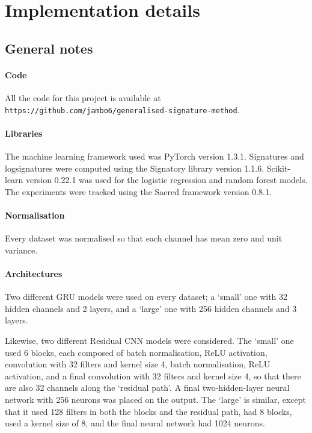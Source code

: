 \documentclass{article}
\theoremstyle{definition}
\theoremstyle{remark}
\begin{document}
	\section{Implementation details}
	\label{sec:implementation_details}
	
	\subsection{General notes}
	
	\paragraph{Code} All the code for this project is available at\\ \texttt{https://github.com/jambo6/generalised-signature-method}.
	
	\paragraph{Libraries} The machine learning framework used was PyTorch \citep{pytorch} version 1.3.1. Signatures and logsignatures were computed using the Signatory library \citep{signatory} version 1.1.6. Scikit-learn \citep{scikit-learn} version 0.22.1 was used for the logistic regression and random forest models. The experiments were tracked using the Sacred framework \citep{greff2017sacred} version 0.8.1.

	\paragraph{Normalisation} Every dataset was normalised so that each channel has mean zero and unit variance.
	
	\paragraph{Architectures} Two different GRU models were used on every dataset; a `small' one with 32 hidden channels and 2 layers, and a `large' one with 256 hidden channels and 3 layers.
	
	Likewise, two different Residual CNN models were considered. The `small' one used 6 blocks, each composed of batch normalisation, ReLU activation, convolution with 32 filters and kernel size 4, batch normalisation, ReLU activation, and a final convolution with 32 filters and kernel size 4, so that there are also 32 channels along the `residual path'. A final two-hidden-layer neural network with 256 neurons was placed on the output. The `large' is similar, except that it used 128 filters in both the blocks and the residual path, had 8 blocks, used a kernel size of 8, and the final neural network had 1024 neurons.
	
\end{document}
